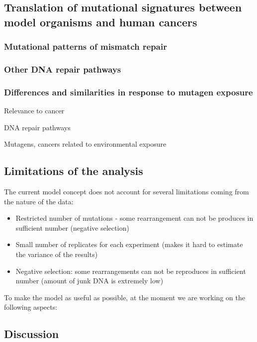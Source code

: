 \subsection{Translation of mutational signatures between model organisms and human cancers}

\subsubsection{Mutational patterns of mismatch repair}

\subsubsection{Other DNA repair pathways}

\subsubsection{Differences and similarities in response to mutagen exposure}

Relevance to cancer

DNA repair pathways

Mutagens, cancers related to environmental exposure




\subsection{Limitations of the analysis}


The current model concept does not account for several limitations coming from the nature of the data:
\begin{itemize}
\itemsep0em
\item Restricted number of mutations - some rearrangement can not be produces in sufficient number (negative selection)
\item Small number of replicates for each experiment (makes it hard to estimate the variance of the results)
\item Negative selection: some rearrangements can not be reproduces in sufficient number (amount of junk DNA is extremely low)
\end{itemize}

To make the model as useful as possible, at the moment we are working on the following aspects:

\subsection{Discussion}




